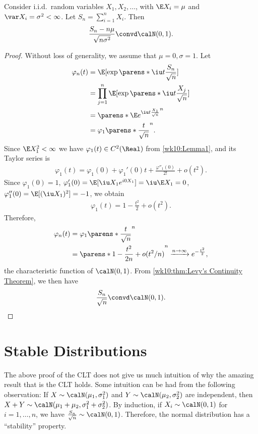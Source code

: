 \documentclass[../aipt.tex]{subfiles}
\begin{document}
\begin{Theorem}\label{wk10:thm:CLT_IID}
Consider i.i.d.\ random variables $X_1,X_2,\ldots$, with $\E X_i= \mu$ and $\var X_i=\sigma^2<\infty$. Let $S_n= \sum_{i=1}^n X_i$. Then  
\begin{align}\label{wk10:eq:CLT}
\frac{S_n-n\mu}{\sqrt{n\sigma^2}} \convd \calN(0,1).
\end{align}
\end{Theorem}
\begin{proof}
Without loss of generality, we assume that $\mu=0,\sigma=1$. Let
\begin{align*}
\varphi_n(t)
&=\E[\exp\parens*{\iu t\frac{S_n}{\sqrt n}}]	\\
& = \prod_{j=1}^n \E[\exp\parens*{\iu t\frac{X_j}{\sqrt n}}]\\
& =\parens*{\E e^{\iu t\frac{X_1}{\sqrt n}}}^n\\					
& = \varphi_1\parens*{\frac t {\sqrt n}}^n.
\end{align*}
Since $\E X_1^2<\infty$ we have $\varphi_1(t) \in C^2(\Real)$ from \cref{wk10:Lemma1}, and its Taylor series is
\begin{align*}
\varphi_1(t)=\varphi_1(0)+\varphi_1'(0) t +\frac{\varphi''_1(0)}{2!}+o(t^2). 
\end{align*}
Since $\varphi_1(0)=1$, $\varphi'_1(0)= \E[\iu X_1 e^{i 0 X_1}]=\iu\E X_1=0$, $\varphi''_1(0)= \E[(\iu X_1)^2]=-1$, we obtain
\begin{align*}
\varphi_1(t)=1-\frac{t^2}{2}+o(t^2).
\end{align*}
Therefore,
\begin{align*}
\varphi_n(t)& = \varphi_1\parens*{\frac t {\sqrt n}}^n\\
& = \parens*{1-\frac{t^2}{2n}+o(t^2/n)}^n \xrightarrow{n\to \infty} e^{-\frac{t^2}{2}}, 
\end{align*}
the characteristic function of $\calN(0,1)$. From \cref{wk10:thm:Levy's Continuity Theorem}, we then have
\begin{align*}
\frac{S_n}{\sqrt n} \convd \calN(0,1).
\end{align*}
\end{proof}

\section{Stable Distributions}

The above proof of the CLT does not give us much intuition of why the amazing result that is the CLT holds. Some intuition can be had from the following observation: If $X \sim \calN(\mu_1,\sigma_1^2)$ and $Y \sim \calN(\mu_2,\sigma_2^2)$ are independent, then $X+Y \sim \calN(\mu_1+\mu_2,\sigma_1^2+\sigma_2^2)$. By induction, if $X_i\sim\calN(0,1)$ for $i=1,\ldots,n$, we have $\frac{S_n}{\sqrt n} \sim \calN(0,1)$. Therefore, the normal distribution has a ``stability'' property. 
\end{document}
